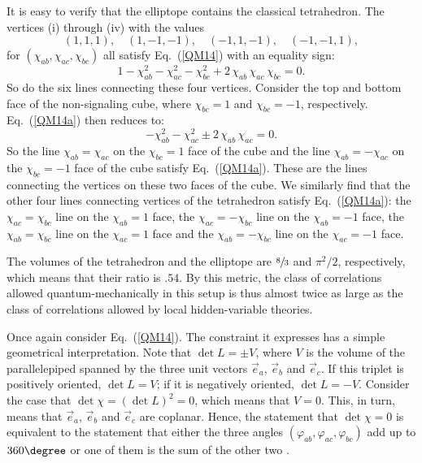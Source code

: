 It is easy to verify that the elliptope contains the classical tetrahedron. The vertices (i) through (iv) with the values
\begin{equation}
(1, 1, 1), \quad (1, -1, -1), \quad (-1, 1, -1), \quad (-1, -1, 1),
\label{vertices a}
\end{equation}
for $(\chi_{ab}, \chi_{ac}, \chi_{bc})$ all satisfy Eq.\ (\ref{QM14}) with an equality sign:
\begin{equation}
1 - \chi_{ab}^2 - \chi_{ac}^2 - \chi_{bc}^2 + 2 \, \chi_{ab} \, \chi_{ac} \, \chi_{bc} = 0.
\label{QM14a}
\end{equation}
So do the six lines connecting these four vertices. Consider the top and bottom face of the non-signaling cube, where $\chi_{bc} =1$ and $\chi_{bc} = -1$, respectively. Eq.\ (\ref{QM14a}) then reduces to:
\begin{equation}
- \chi_{ab}^2 - \chi_{ac}^2 \pm 2\, \chi_{ab} \, \chi_{ac} = 0.
\label{QM14b}
\end{equation}
So the line $\chi_{ab} = \chi_{ac}$ on the $\chi_{bc} =1$ face of the cube and the line $\chi_{ab} = -\chi_{ac}$ on the $\chi_{bc} =-1$ face of the cube satisfy Eq.\ (\ref{QM14a}). These are the lines connecting the vertices on these two faces of the cube. We similarly find that the other four lines connecting vertices of the tetrahedron satisfy Eq.\ (\ref{QM14a}): the $\chi_{ac} = \chi_{bc}$ line on the $\chi_{ab}=1$ face, the $\chi_{ac}=-\chi_{bc}$ line on the $\chi_{ab}=-1$ face, the $\chi_{ab}= \chi_{bc}$ line on the $\chi_{ac}=1$ face and the $\chi_{ab}=-\chi_{bc}$ line on the $\chi_{ac}=-1$ face.
 
The volumes of the tetrahedron and the elliptope are $\sfrac83$ and $\pi^2/2$, respectively, which means that their ratio is $.54$. By this metric, the class of correlations allowed quantum-mechanically in this setup is thus almost twice as large as the class of correlations allowed by local hidden-variable theories.     

Once again consider Eq.\ (\ref{QM14}). The constraint it expresses has a simple geometrical interpretation. Note that $\det{L} = \pm V$, where $V$ is the volume of the parallelepiped spanned by the three unit vectors $\vec{e}_a$, $\vec{e}_b$ and $\vec{e}_c$. If this triplet is positively oriented, $\det{L} = V$; if it is negatively oriented, $\det{L} = -V$. Consider the case that $\det{\chi} = (\det{L})^2 = 0$, which means that $V=0$. This, in turn, means that $\vec{e}_a$, $\vec{e}_b$ and $\vec{e}_c$ are coplanar. Hence, the statement that $\det{\chi} =0$ is equivalent to the statement that either the three angles $(\varphi_{ab}, \varphi_{ac}, \varphi_{bc})$ add up to $360\degree$ or one of them is the sum of the other two \citep[p.\ 515]{Deza and Laurent 1997}.

